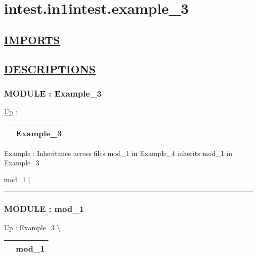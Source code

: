 \chapter*{intest.in1intest.example\_3}
\hypertarget{ecldoc:toc:intest.in1intest.example_3}{}

\section*{\underline{IMPORTS}}

\section*{\underline{DESCRIPTIONS}}
\subsection*{MODULE : Example\_3}
\hypertarget{ecldoc:intest.in1intest.Example_3}{}
\hyperlink{ecldoc:toc:intest/in1intest}{Up} :

{\renewcommand{\arraystretch}{1.5}
\begin{tabularx}{\textwidth}{|>{\raggedright\arraybackslash}l|X|}
\hline
\hspace{0pt} & Example\_3 \\
\hline
\end{tabularx}
}

\par
Example : Inheritance across files mod\_1 in Example\_4 inherits mod\_1 in Example\_3


\hyperlink{ecldoc:intest.in1intest.Example_3.mod_1}{mod\_1}  |

\rule{\linewidth}{0.5pt}

\subsection*{MODULE : mod\_1}
\hypertarget{ecldoc:intest.in1intest.Example_3.mod_1}{}
\hyperlink{ecldoc:intest.in1intest.Example_3}{Up} :
\hspace{0pt} \hyperlink{ecldoc:intest.in1intest.Example_3}{Example_3} \textbackslash 

{\renewcommand{\arraystretch}{1.5}
\begin{tabularx}{\textwidth}{|>{\raggedright\arraybackslash}l|X|}
\hline
\hspace{0pt} & mod\_1 \\
\hline
\end{tabularx}
}

\par


